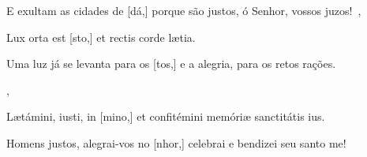 {    {E exultam as cidades de [dá,] porque são justos, ó Senhor, vossos juzos!~\Responsorium},
  {\item {}Lux orta est [sto,] et rectis corde lætia.}
    {\item {}Uma luz já se levanta para os [tos,] e a alegria, para os retos rações.~\Responsorium},
  {\item {}Lætámini, iusti, in [mino,] et confitémini memóriæ sanctitátis ius.}
    {\item {}Homens justos, alegrai-vos no [nhor,] celebrai e bendizei seu santo me!~\Responsorium}
}